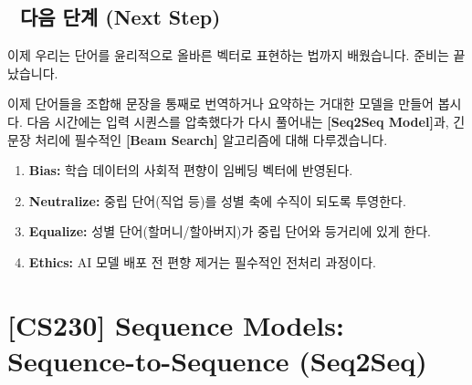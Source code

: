 \documentclass[11pt,a4paper]{book}
\theoremstyle{definition}
\begin{document}
\section*{🔗 다음 단계 (Next Step)}
이제 우리는 단어를 윤리적으로 올바른 벡터로 표현하는 법까지 배웠습니다. 준비는 끝났습니다.

이제 단어들을 조합해 문장을 통째로 번역하거나 요약하는 거대한 모델을 만들어 봅시다.
다음 시간에는 입력 시퀀스를 압축했다가 다시 풀어내는 \textbf{[Seq2Seq Model]}과, 긴 문장 처리에 필수적인 \textbf{[Beam Search]} 알고리즘에 대해 다루겠습니다.

\vspace{0.5cm}

\begin{summarybox}[title={단원 요약 (Cheat Sheet)}]
\begin{enumerate}
    \item \textbf{Bias:} 학습 데이터의 사회적 편향이 임베딩 벡터에 반영된다.
    \item \textbf{Neutralize:} 중립 단어(직업 등)를 성별 축에 수직이 되도록 투영한다.
    \item \textbf{Equalize:} 성별 단어(할머니/할아버지)가 중립 단어와 등거리에 있게 한다.
    \item \textbf{Ethics:} AI 모델 배포 전 편향 제거는 필수적인 전처리 과정이다.
\end{enumerate}
\end{summarybox}


\chapter{[CS230] Sequence Models: \\ Sequence-to-Sequence (Seq2Seq)}
\label{ch:lecture46}

\end{document}
